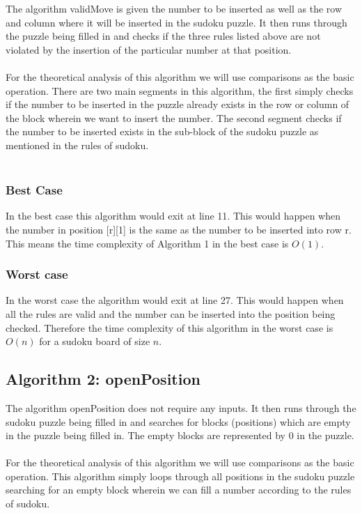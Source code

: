 \documentclass[12pt,a4paper,titlepage]{article}
\begin{document}
The algorithm validMove is given the number to be inserted as well as the row and column where it will be inserted in the sudoku puzzle. It then runs through the puzzle being filled in and checks if the three rules listed above are not violated by the insertion of the particular number at that position.
\\
\\
For the theoretical analysis of this algorithm we will use comparisons as the basic operation. There are two main segments in this algorithm, the first simply checks if  the number to be inserted in the puzzle already exists in the row or column of the block wherein we want to insert the number. The second segment checks if the number to be inserted exists in the sub-block of the sudoku puzzle as mentioned in the rules of sudoku.
\\
\\

\subsubsection{Best Case}

In the best case this algorithm would exit at line 11. This would happen when the number in position [r][1] is the same as the number to be inserted into row r. This means the time complexity of Algorithm 1 in the best case is $O(1)$.

\subsubsection{Worst case}

In the worst case the algorithm would exit at line 27. This would happen when all the rules are valid and the number can be inserted into the position being checked. Therefore the time complexity of this algorithm in the worst case is $O(n)$ for a sudoku board of size $n$.

\subsection{Algorithm 2: openPosition}

The algorithm openPosition does not require any inputs. It then runs through the sudoku puzzle being filled in and searches for blocks (positions) which are empty in the puzzle being filled in. The empty blocks are represented by 0 in the puzzle.
\\
\\
For the theoretical analysis of this algorithm we will use comparisons as the basic operation. This algorithm simply loops through all positions in the sudoku puzzle searching for an empty block wherein we can fill a number according to the rules of sudoku. 
\end{document}
